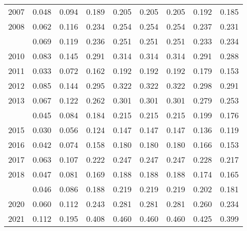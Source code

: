 \documentclass[
]{article}
\begin{document}
\begin{longtable}[t]{lrrrrrrrr}
2007 & 0.048 & 0.094 & 0.189 & 0.205 & 0.205 & 0.205 & 0.192 & 0.185\\
2008 & 0.062 & 0.116 & 0.234 & 0.254 & 0.254 & 0.254 & 0.237 & 0.231\\
\addlinespace
2009 & 0.069 & 0.119 & 0.236 & 0.251 & 0.251 & 0.251 & 0.233 & 0.234\\
2010 & 0.083 & 0.145 & 0.291 & 0.314 & 0.314 & 0.314 & 0.291 & 0.288\\
2011 & 0.033 & 0.072 & 0.162 & 0.192 & 0.192 & 0.192 & 0.179 & 0.153\\
2012 & 0.085 & 0.144 & 0.295 & 0.322 & 0.322 & 0.322 & 0.298 & 0.291\\
2013 & 0.067 & 0.122 & 0.262 & 0.301 & 0.301 & 0.301 & 0.279 & 0.253\\
\addlinespace
2014 & 0.045 & 0.084 & 0.184 & 0.215 & 0.215 & 0.215 & 0.199 & 0.176\\
2015 & 0.030 & 0.056 & 0.124 & 0.147 & 0.147 & 0.147 & 0.136 & 0.119\\
2016 & 0.042 & 0.074 & 0.158 & 0.180 & 0.180 & 0.180 & 0.166 & 0.153\\
2017 & 0.063 & 0.107 & 0.222 & 0.247 & 0.247 & 0.247 & 0.228 & 0.217\\
2018 & 0.047 & 0.081 & 0.169 & 0.188 & 0.188 & 0.188 & 0.174 & 0.165\\
\addlinespace
2019 & 0.046 & 0.086 & 0.188 & 0.219 & 0.219 & 0.219 & 0.202 & 0.181\\
2020 & 0.060 & 0.112 & 0.243 & 0.281 & 0.281 & 0.281 & 0.260 & 0.234\\
2021 & 0.112 & 0.195 & 0.408 & 0.460 & 0.460 & 0.460 & 0.425 & 0.399\\*
\end{longtable}
\end{document}

